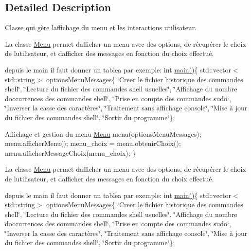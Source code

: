 \subsection{Detailed Description}
Classe qui gère l\textquotesingle{}affichage du menu et les interactions utilisateur. 

La classe {\ttfamily \hyperlink{classMenu}{Menu}} permet d\textquotesingle{}afficher un menu avec des options, de récupérer le choix de l\textquotesingle{}utilisateur, et d\textquotesingle{}afficher des messages en fonction du choix effectué.

depuis le main il faut donner un tablea par exemple\+: int \hyperlink{htop_8c_a3c04138a5bfe5d72780bb7e82a18e627}{main()}\{ std\+::vector$<$std\+::string$>$ options\+Menu\+Messages\{ \char`\"{}\+Creer le fichier historique des commandes shell\char`\"{}, \char`\"{}\+Lecture du fichier des commandes shell usuelles\char`\"{}, \char`\"{}\+Affichage du nombre d\textquotesingle{}occurrences des commandes shell\char`\"{}, \char`\"{}\+Prise en compte des commandes sudo\char`\"{}, \char`\"{}\+Inverser la casse des caractères\char`\"{}, \char`\"{}\+Traitement sans affichage console\char`\"{}, \char`\"{}\+Mise à jour du fichier des commandes shell\char`\"{}, \char`\"{}\+Sortir du programme\char`\"{}\};

Affichage et gestion du menu \hyperlink{classMenu}{Menu} menu(options\+Menu\+Messages); menu.\+afficher\+Menu(); menu\+\_\+choix = menu.\+obtenir\+Choix(); menu.\+afficher\+Message\+Choix(menu\+\_\+choix); \}

La classe {\ttfamily \hyperlink{classMenu}{Menu}} permet d\textquotesingle{}afficher un menu avec des options, de récupérer le choix de l\textquotesingle{}utilisateur, et d\textquotesingle{}afficher des messages en fonction du choix effectué.

depuis le main il faut donner un tablea par exemple\+: int \hyperlink{htop_8c_a3c04138a5bfe5d72780bb7e82a18e627}{main()}\{ std\+::vector$<$std\+::string$>$ options\+Menu\+Messages\{ \char`\"{}\+Creer le fichier historique des commandes shell\char`\"{}, \char`\"{}\+Lecture du fichier des commandes shell usuelles\char`\"{}, \char`\"{}\+Affichage du nombre d\textquotesingle{}occurrences des commandes shell\char`\"{}, \char`\"{}\+Prise en compte des commandes sudo\char`\"{}, \char`\"{}\+Inverser la casse des caractères\char`\"{}, \char`\"{}\+Traitement sans affichage console\char`\"{}, \char`\"{}\+Mise à jour du fichier des commandes shell\char`\"{}, \char`\"{}\+Sortir du programme\char`\"{}\};


